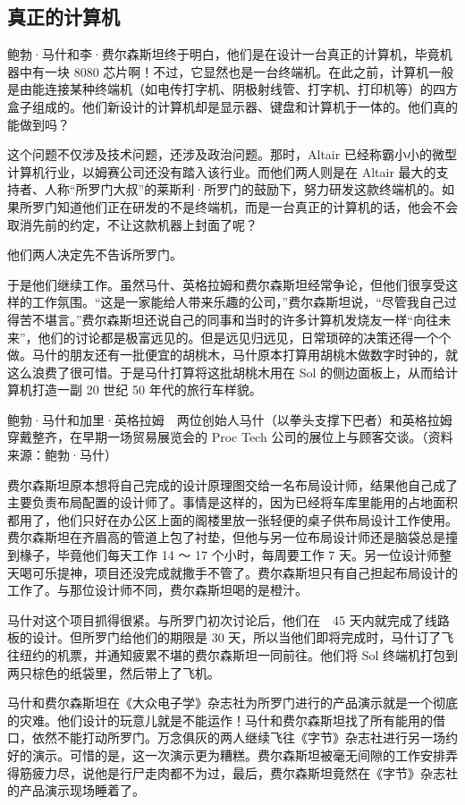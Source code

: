 \documentclass[12pt,UTF8]{ctexbook}
\begin{document}
\subsection{真正的计算机}


鲍勃·马什和李·费尔森斯坦终于明白，他们是在设计一台真正的计算机，毕竟机器中有一块 8080 芯片啊！不过，它显然也是一台终端机。在此之前，计算机一般是由能连接某种终端机（如电传打字机、阴极射线管、打字机、打印机等）的四方盒子组成的。他们新设计的计算机却是显示器、键盘和计算机于一体的。他们真的能做到吗？

这个问题不仅涉及技术问题，还涉及政治问题。那时，Altair 已经称霸小小的微型计算机行业，以姆赛公司还没有踏入该行业。而他们两人则是在 Altair 最大的支持者、人称“所罗门大叔”的莱斯利·所罗门的鼓励下，努力研发这款终端机的。如果所罗门知道他们正在研发的不是终端机，而是一台真正的计算机的话，他会不会取消先前的约定，不让这款机器上封面了呢？

他们两人决定先不告诉所罗门。

于是他们继续工作。虽然马什、英格拉姆和费尔森斯坦经常争论，但他们很享受这样的工作氛围。“这是一家能给人带来乐趣的公司，”费尔森斯坦说，“尽管我自己过得苦不堪言。”费尔森斯坦还说自己的同事和当时的许多计算机发烧友一样“向往未来”，他们的讨论都是极富远见的。但是远见归远见，日常琐碎的决策还得一个个做。马什的朋友还有一批便宜的胡桃木，马什原本打算用胡桃木做数字时钟的，就这么浪费了很可惜。于是马什打算将这批胡桃木用在 Sol 的侧边面板上，从而给计算机打造一副 20 世纪 50 年代的旅行车样貌。



鲍勃·马什和加里·英格拉姆　两位创始人马什（以拳头支撑下巴者）和英格拉姆穿戴整齐，在早期一场贸易展览会的 Proc Tech 公司的展位上与顾客交谈。（资料来源：鲍勃·马什）

费尔森斯坦原本想将自己完成的设计原理图交给一名布局设计师，结果他自己成了主要负责布局配置的设计师了。事情是这样的，因为已经将车库里能用的占地面积都用了，他们只好在办公区上面的阁楼里放一张轻便的桌子供布局设计工作使用。费尔森斯坦在齐眉高的管道上包了衬垫，但他与另一位布局设计师还是脑袋总是撞到椽子，毕竟他们每天工作 14 ～ 17 个小时，每周要工作 7 天。另一位设计师整天喝可乐提神，项目还没完成就撒手不管了。费尔森斯坦只有自己担起布局设计的工作了。与那位设计师不同，费尔森斯坦喝的是橙汁。

马什对这个项目抓得很紧。与所罗门初次讨论后，他们在　45 天内就完成了线路板的设计。但所罗门给他们的期限是 30 天，所以当他们即将完成时，马什订了飞往纽约的机票，并通知疲累不堪的费尔森斯坦一同前往。他们将 Sol 终端机打包到两只棕色的纸袋里，然后带上了飞机。

马什和费尔森斯坦在《大众电子学》杂志社为所罗门进行的产品演示就是一个彻底的灾难。他们设计的玩意儿就是不能运作！马什和费尔森斯坦找了所有能用的借口，依然不能打动所罗门。万念俱灰的两人继续飞往《字节》杂志社进行另一场约好的演示。可惜的是，这一次演示更为糟糕。费尔森斯坦被毫无间隙的工作安排弄得筋疲力尽，说他是行尸走肉都不为过，最后，费尔森斯坦竟然在《字节》杂志社的产品演示现场睡着了。
\end{document}

